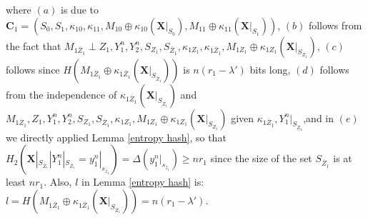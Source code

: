 \documentclass[runningheads]{llncs}
\begin{document}
\begin{itemize}
    where $(a)$ is due to $\mathbf{C}_1 = (S_0,S_1, \kappa_{10}, \kappa_{11}, M_{10}\oplus\kappa_{10} (\mathbf{X}|_{S_0}), M_{11}\oplus\kappa_{11}(\mathbf{X}|_{S_1}))$, $(b)$ follows from the fact that $M_{1\overline{Z}_1} \perp Z_1, Y_1^n, Y_2^n,  S_{Z_1},S_{\overline{Z}_1}, \kappa_{1Z_1}, \kappa_{1\overline{Z}_1}, M_{1Z_1}\oplus\kappa_{1Z_1} (\mathbf{X}|_{S_{Z_1}})$, $(c)$ follows since $H (  M_{1\overline{Z}_1}\oplus\kappa_{1\overline{Z}_1}(\mathbf{X}|_{S_{\overline{Z}_1}}))$ is $n(r_1-\lambda')$ bits long, $(d)$ follows from the independence of $\kappa_{1\overline{Z}_1}(\mathbf{X}|_{S_{\overline{Z}_1}})$ and\linebreak $M_{1\overline{Z}_1},Z_1, Y_1^n, Y_2^n,  S_{Z_1},S_{\overline{Z}_1}, \kappa_{1Z_1}, M_{1Z_1}\oplus\kappa_{1Z_1} (\mathbf{X}|_{S_{Z_1}})$ given $\kappa_{1\overline{Z}_1},Y_1^n|_{S_{\overline{Z}_1}}$,\linebreak and in $(e)$ we directly applied Lemma \ref{entropy hash}, so that $H_2(\mathbf{X}|_{S_{\overline{Z}_1}}|Y_1^n|_{S_{\overline{Z}_1}}=y_1^n|_{s_{\overline{z}_1}}) = \Delta(y_1^n|_{s_{\overline{z}_1}}) \geq n r_1$ since the size of the set $S_{\overline{Z}_1}$ is at least $n r_1$. Also, $l$ in Lemma \ref{entropy hash} is: $l = H (  M_{1\overline{Z}_1}\oplus\kappa_{1\overline{Z}_1}(\mathbf{X}|_{S_{\overline{Z}_1}})) = n(r_1-\lambda')$. 
    

\end{itemize}
\end{document}
